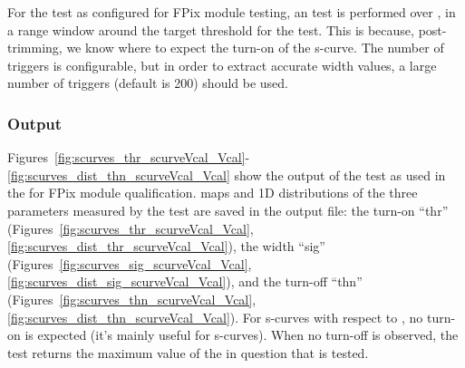 For the \scurves test as configured for FPix module testing, 
an \scurves test is performed over \vcal, in a \vcal range window around the target threshold for the \trimming test.
This is because, post-trimming, we know where to expect the turn-on of the s-curve.
The number of triggers is configurable, but in order to extract accurate width values, 
a large number of triggers (default is 200) should be used.

\subsubsection{Output}

Figures~\ref{fig:scurves_thr_scurveVcal_Vcal}-\ref{fig:scurves_dist_thn_scurveVcal_Vcal} 
show the output of the \scurves test as used in the \fulltest for FPix module qualification.
\roc maps and 1D distributions of the three parameters measured by the test are saved in the output file: 
the turn-on ``thr'' (Figures~\ref{fig:scurves_thr_scurveVcal_Vcal},\ref{fig:scurves_dist_thr_scurveVcal_Vcal}),
the width ``sig'' (Figures~\ref{fig:scurves_sig_scurveVcal_Vcal},\ref{fig:scurves_dist_sig_scurveVcal_Vcal}),
and the turn-off ``thn'' (Figures~\ref{fig:scurves_thn_scurveVcal_Vcal},\ref{fig:scurves_dist_thn_scurveVcal_Vcal}).
For s-curves with respect to \vcal, no turn-on is expected (it's mainly useful for \vthrcomp s-curves).
When no turn-off is observed, the test returns the maximum value of the \dac in question that is tested.

